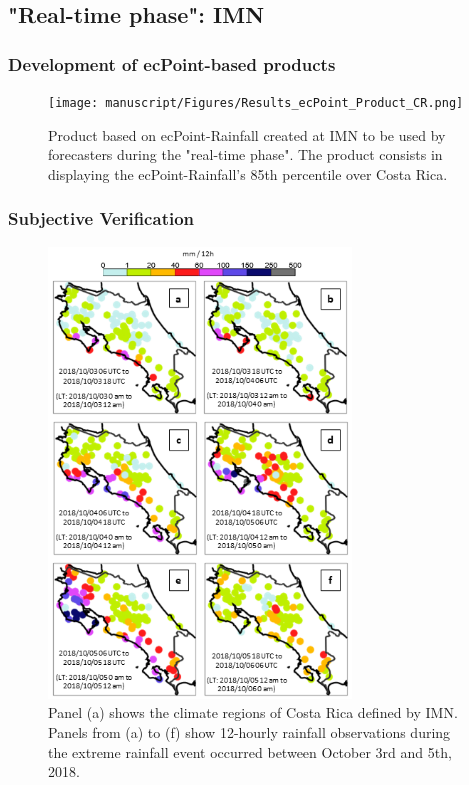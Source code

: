 \subsection{"Real-time phase": IMN}

\subsubsection{Development of ecPoint-based products}

\begin{figure}
\centerline{\texttt{[image: manuscript/Figures/Results\_ecPoint\_Product\_CR.png]}}
\caption{Product based on ecPoint-Rainfall created at IMN to be used by forecasters during the "real-time phase". The product consists in displaying the ecPoint-Rainfall's 85th percentile over Costa Rica.}
\label{ecPoint_Product_CR}
\end{figure}

\subsubsection{Subjective Verification}

\begin{figure}
\centerline{\includegraphics[width=19pc]{manuscript/Figures/Results_Obs_CaseStudy_CR.png}}
\caption{Panel (a) shows the climate regions of Costa Rica defined by IMN. Panels from (a) to (f) show 12-hourly rainfall observations during the extreme rainfall event occurred between October 3rd and 5th, 2018.}
\label{Obs_CaseStudy_CR}
\end{figure}

